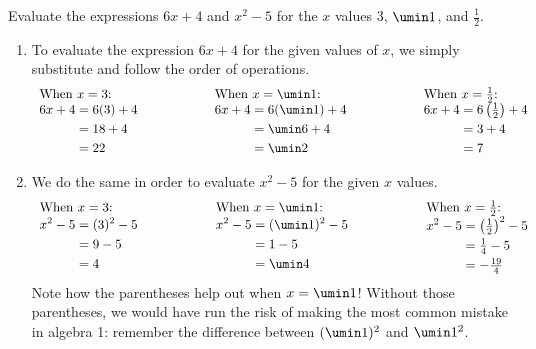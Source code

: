 \begin{boxedex}
Evaluate the expressions $6x+ 4$ and $x^2 - 5$ for the $x$ values 3, $\umin1$, and $\frac{1}{2}$.

\exsoln{}
\begin{enumerate}[label={(\alph*)}]
\item To evaluate the expression $6x + 4$ for the given values of $x$, we simply substitute and follow the order of operations.
\[
\begin{array}{lllll}
\text{When $x=3$:}
&
&
\text{When $x=\umin1$:}
&
&
\text{When $x=\frac{1}{2}$:}
\\ %
\begin{aligned}
6x + 4 & = 6(3) + 4\\
& = 18 + 4\\
& = 22
\end{aligned}
&
\qquad\qquad
&
\begin{aligned}
6x + 4 & = 6(\umin1) + 4\\
& = \umin6 + 4\\
& = \umin2
\end{aligned}
&
\qquad\qquad
&
\begin{aligned}
6x + 4 & = 6\left(\tfrac{1}{2}\right) + 4\\
& = 3 + 4\\
& = 7
\end{aligned}
\end{array}
\]

\item We do the same in order to evaluate $x^2 - 5$ for the given $x$ values.
\[
\begin{array}{lllll}
\text{When $x=3$:}
&
&
\text{When $x=\umin1$:}
&
&
\text{When $x=\frac{1}{2}$:}
\\ %
\begin{aligned}
x^2 - 5 & = (3)^2 - 5\\
& = 9 - 5\\
& = 4
\end{aligned}
&
\qquad\qquad
&
\begin{aligned}
x^2 - 5 & = (\umin1)^2 - 5\\
& = 1 - 5\\
& = \umin4
\end{aligned}
&
\qquad\qquad
&
\begin{aligned}
x^2 - 5 & = \left(\tfrac{1}{2}\right)^2 - 5\\
& = \tfrac{1}{4} - 5\\
& = -\tfrac{19}{4}
\end{aligned}
\end{array}
\]
Note how the parentheses help out when $x = \umin1$! Without those parentheses, we would have run the risk of making the most common mistake in algebra 1: remember the difference between $(\umin1)^2$ and $\umin1^2$.
\end{enumerate}
\end{boxedex}

